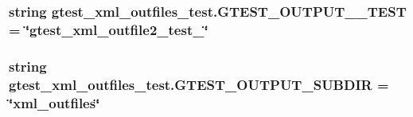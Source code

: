 \subsubsection[{G\+T\+E\+S\+T\+\_\+\+O\+U\+T\+P\+U\+T\+\_\+2\+\_\+\+T\+E\+S\+T}]{\setlength{\rightskip}{0pt plus 5cm}string gtest\+\_\+xml\+\_\+outfiles\+\_\+test.\+G\+T\+E\+S\+T\+\_\+\+O\+U\+T\+P\+U\+T\+\_\+\_\+\+T\+E\+S\+T = \char`\"{}gtest\+\_\+xml\+\_\+outfile2\+\_\+test\+\_\+\char`\"{}}\label{namespacegtest__xml__outfiles__test_acf82219e56619aab5c114b6f0a7c3a5e}
\hypertarget{namespacegtest__xml__outfiles__test_a6b3b62791305e64ec137b33bd9351b1a}{}
\subsubsection[{G\+T\+E\+S\+T\+\_\+\+O\+U\+T\+P\+U\+T\+\_\+\+S\+U\+B\+D\+I\+R}]{\setlength{\rightskip}{0pt plus 5cm}string gtest\+\_\+xml\+\_\+outfiles\+\_\+test.\+G\+T\+E\+S\+T\+\_\+\+O\+U\+T\+P\+U\+T\+\_\+\+S\+U\+B\+D\+I\+R = \char`\"{}xml\+\_\+outfiles\char`\"{}}\label{namespacegtest__xml__outfiles__test_a6b3b62791305e64ec137b33bd9351b1a}
